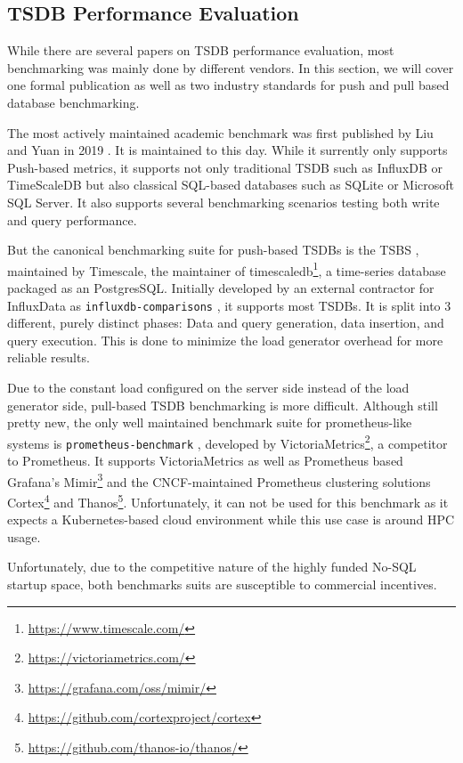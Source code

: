 \subsection{TSDB Performance Evaluation}
While there are several papers on \ac{TSDB} performance evaluation, most benchmarking was mainly
done by different vendors. In this section, we will cover one formal publication as well as two
industry standards for push and pull based database benchmarking.

The most actively maintained academic benchmark was first published by Liu and Yuan in 2019 \cite{benchmark_paper}.
It is maintained to this day. While it surrently only supports Push-based metrics, it supports not
only traditional \ac{TSDB} such as InfluxDB or TimeScaleDB but also classical SQL-based databases
such as SQLite or Microsoft SQL Server. It also supports several benchmarking scenarios testing
both write and query performance.

But the canonical benchmarking suite for push-based \acp{TSDB} is the \ac{TSBS} \cite{tsbs}, 
maintained by Timescale, the maintainer of timescaledb\footnote{\url{https://www.timescale.com/}}, a 
time-series database packaged as an PostgresSQL. Initially developed by an external contractor
for InfluxData as \texttt{influxdb-comparisons} \cite{influxcomp}, it supports most \acp{TSDB}.
It is split into 3 different, purely distinct phases: Data and query generation, data insertion,
and query execution. This is done to minimize the load generator overhead for more reliable results.

Due to the constant load configured on the server side instead of the load generator side, pull-based
\ac{TSDB} benchmarking is more difficult. Although still pretty new, the only well maintained
benchmark suite for prometheus-like systems is \texttt{prometheus-benchmark} \cite{prombench}, developed by 
VictoriaMetrics\footnote{\url{https://victoriametrics.com/}}, a competitor to Prometheus. It supports
VictoriaMetrics as well as Prometheus based Grafana's Mimir\footnote{\url{https://grafana.com/oss/mimir/}}
and the \ac{CNCF}-maintained Prometheus clustering solutions Cortex\footnote{\url{https://github.com/cortexproject/cortex}}
and Thanos\footnote{\url{https://github.com/thanos-io/thanos/}}. Unfortunately, it can not be used for
this benchmark as it expects a Kubernetes-based cloud environment while this use case is around \ac{HPC} usage.

Unfortunately, due to the competitive nature of the highly funded No-SQL startup space, both
benchmarks suits are susceptible to commercial incentives.


